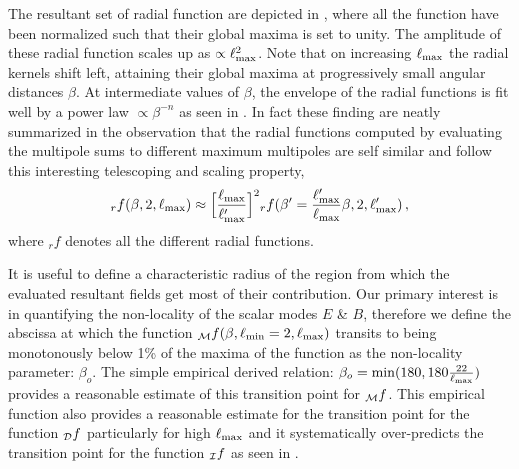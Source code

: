 The resultant set of radial function are depicted in , where all the function have been normalized such that their global maxima is set to unity. The amplitude of these radial function scales up as $\propto \ell_{\rm max}^2$. Note that on increasing $\ell_{\rm max}$ the radial kernels shift left, attaining their global maxima at progressively small angular distances $\beta$.  At intermediate values of $\beta$, the envelope of the radial functions is fit well by a power law $ \propto \beta^{-n}$ as seen in .
In fact these finding are neatly summarized in the observation that the radial functions computed by evaluating the multipole sums to different maximum multipoles are self similar and follow this interesting telescoping and scaling property, $${}_rf(\beta,2,\ell_{\rm max}) \approx \Big[\frac{\ell_{\rm max}}{\ell'_{\rm max}}\Big]^2{}_rf(\beta'=\frac{\ell'_{\rm max}}{\ell_{\rm max}} \beta ,2,\ell'_{\rm max}) \,,$$ where ${}_rf$ denotes all the different radial functions. 

It is useful to define a characteristic radius of the region from which the evaluated resultant fields get most of their contribution.  Our primary interest is in quantifying the non-locality of the scalar modes $E$ \& $B$, therefore we define the abscissa at which the function ${_{\mathcal{M}}f}(\beta,\ell_{\rm min}=2,\ell_{\rm max})$ transits to being monotonously below 1\% of the maxima of the function as the non-locality parameter: $\beta_{o}$.
The simple empirical derived relation: $\beta_o= {\rm min}(180,180 \frac{22}{\ell_{\rm max}})$ provides a reasonable estimate of this transition point for  ${}_{\mathcal{M}}f$. This empirical function also provides a reasonable estimate for the transition point for the function ${}_{\mathcal{D}}f$ particularly for high $\ell_{\rm max}$ and it systematically over-predicts the transition point for the function ${}_{\mathcal{I}}f$ as seen in .